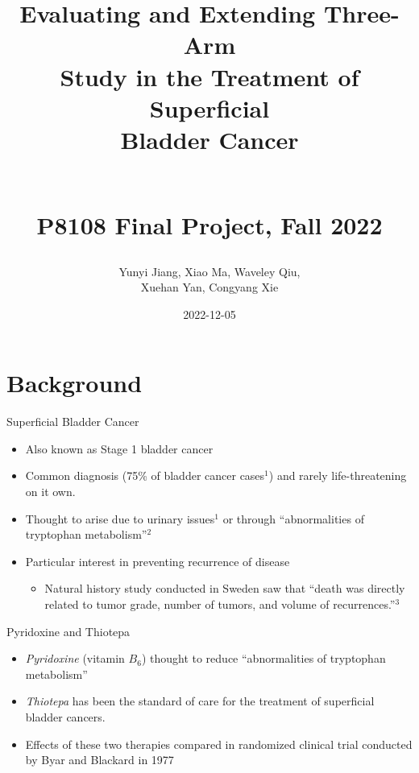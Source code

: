 \documentclass[
  ignorenonframetext,
]{beamer}
\title{Evaluating and Extending Three-Arm\\
Study in the Treatment of Superficial\\
Bladder Cancer\\
\strut \\
P8108 Final Project, Fall 2022\\}
\author{Yunyi Jiang, Xiao Ma, Waveley Qiu,\\
Xuehan Yan, Congyang Xie\\}
\date{2022-12-05}
\providecommand{\tightlist}{%
  \setlength{\itemsep}{0pt}\setlength{\parskip}{0pt}}
\begin{document}
\frame{\titlepage}

\hypertarget{background}{%
\section{Background}\label{background}}

\begin{frame}{Superficial Bladder Cancer}
\protect\hypertarget{superficial-bladder-cancer}{}
\begin{itemize}
\tightlist
\item
  Also known as Stage 1 bladder cancer
\item
  Common diagnosis (75\% of bladder cancer cases\(^1\)) and rarely
  life-threatening on it own.
\item
  Thought to arise due to urinary issues\(^1\) or through
  ``abnormalities of tryptophan metabolism''\(^2\)
\item
  Particular interest in preventing recurrence of disease

  \begin{itemize}
  \tightlist
  \item
    Natural history study conducted in Sweden saw that ``death was
    directly related to tumor grade, number of tumors, and volume of
    recurrences.''\(^3\)
  \end{itemize}
\end{itemize}
\end{frame}

\begin{frame}{Pyridoxine and Thiotepa}
\protect\hypertarget{pyridoxine-and-thiotepa}{}
\begin{itemize}
\tightlist
\item
  \emph{Pyridoxine} (vitamin \(B_6\)) thought to reduce ``abnormalities
  of tryptophan metabolism''
\item
  \emph{Thiotepa} has been the standard of care for the treatment of
  superficial bladder cancers.
\item
  Effects of these two therapies compared in randomized clinical trial
  conducted by Byar and Blackard in 1977
\end{itemize}
\end{frame}
\end{document}
